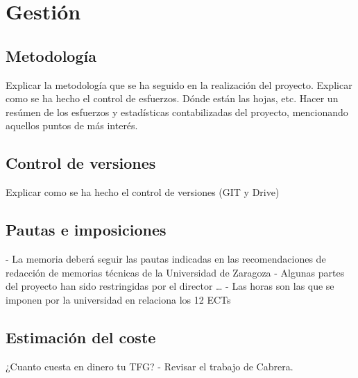 \chapter{Gestión} \label{gestion}
\section{Metodología} \label{gestion.metodologia}
Explicar la metodología que se ha seguido en la realización del proyecto. Explicar como se ha hecho el control de esfuerzos. Dónde están las hojas, etc. Hacer un resúmen de los esfuerzos y estadísticas contabilizadas del proyecto, mencionando aquellos puntos de más interés. 

\section{Control de versiones} \label{gestion.control}
Explicar como se ha hecho el control de versiones (GIT y Drive) 
\section{Pautas e imposiciones} \label{gestion.pautas}
- La memoria deberá seguir las pautas indicadas en las recomendaciones de redacción de memorias técnicas de la Universidad de Zaragoza
- Algunas partes del proyecto han sido restringidas por el director … 
- Las horas son las que se imponen por la universidad en relaciona los 12 ECTs

\section{Estimación del coste} \label{gestion.estimacion}
¿Cuanto cuesta en dinero tu TFG? - Revisar el trabajo de Cabrera.